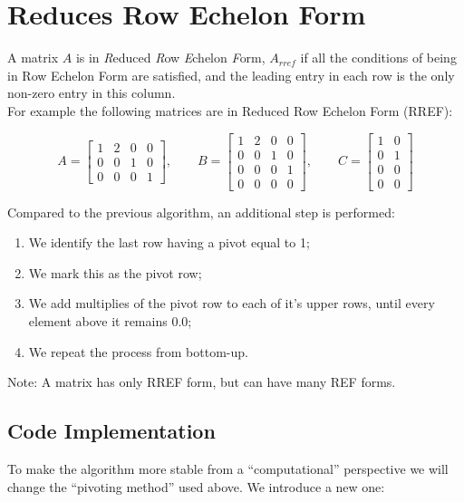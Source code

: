 \section{Reduces Row Echelon Form}

A matrix $A$ is in {\it R}educed {\it R}ow {\it E}chelon {\it F}orm, $A_{rref}$ if all the conditions of being in Row Echelon Form are satisfied, and the leading entry in each row is the only non-zero entry in this column.
\\

For example the following matrices are in Reduced Row Echelon Form (RREF):

$$
A=
\begin{bmatrix}
1 & 2 & 0 & 0 \\
0 & 0 & 1 & 0 \\
0 & 0 & 0 & 1
\end{bmatrix}
, \qquad
B=
\begin{bmatrix}
1 & 2 & 0 & 0 \\
0 & 0 & 1 & 0 \\
0 & 0 & 0 & 1 \\
0 & 0 & 0 & 0
\end{bmatrix}
, \qquad
C=
\begin{bmatrix}
1 & 0 \\
0 & 1 \\
0 & 0 \\
0 & 0
\end{bmatrix}
$$

Compared to the previous algorithm, an additional step is performed:

\begin{enumerate} 
\item We identify the last row having a pivot equal to 1;
\item We mark this as the pivot row;
\item We add multiplies of the pivot row to each of it’s upper rows, until every element above it remains 0.0;
\item We repeat the process from bottom-up.
\end{enumerate}

Note: A matrix has only RREF form, but can have many REF forms.

\subsection{Code Implementation}

To make the algorithm more stable from a ``computational'' perspective we will change the ``pivoting method'' used above. We introduce a new one:

